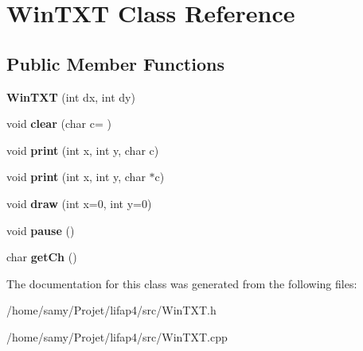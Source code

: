 \hypertarget{classWinTXT}{}\section{Win\+T\+XT Class Reference}
\label{classWinTXT}
\subsection*{Public Member Functions}
\begin{DoxyCompactItemize}
\item 
\mbox{\label{classWinTXT_ad471ddd48d2a7c43acccd1204e419527}} 
{\bfseries Win\+T\+XT} (int dx, int dy)
\item 
\mbox{\label{classWinTXT_a1b4cb203533f78bed29498591631f436}} 
void {\bfseries clear} (char c=\textquotesingle{} \textquotesingle{})
\item 
\mbox{\label{classWinTXT_a407cce45e7f81546540f4f8a9b85ce45}} 
void {\bfseries print} (int x, int y, char c)
\item 
\mbox{\label{classWinTXT_ad021d5fb9862b9ea7985f8cef50451e2}} 
void {\bfseries print} (int x, int y, char $\ast$c)
\item 
\mbox{\label{classWinTXT_af83a18827593465fc397983c97b4e886}} 
void {\bfseries draw} (int x=0, int y=0)
\item 
\mbox{\label{classWinTXT_a3e8793fd263bb51a62ec8a5e89904c49}} 
void {\bfseries pause} ()
\item 
\mbox{\label{classWinTXT_a418c66475403586ac57a80eceb409166}} 
char {\bfseries get\+Ch} ()
\end{DoxyCompactItemize}


The documentation for this class was generated from the following files\+:\begin{DoxyCompactItemize}
\item 
/home/samy/\+Projet/lifap4/src/Win\+T\+X\+T.\+h\item 
/home/samy/\+Projet/lifap4/src/Win\+T\+X\+T.\+cpp\end{DoxyCompactItemize}
